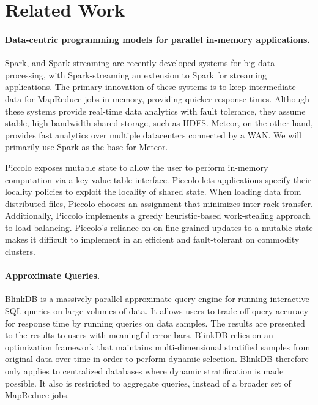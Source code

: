 \section{Related Work}

\paragraph{Data-centric programming models for parallel in-memory applications.}
Spark, and Spark-streaming \cite{spark} are recently developed systems for big-data processing, with Spark-streaming an extension to Spark for streaming applications. The primary innovation of these systems is to keep intermediate data for MapReduce jobs in memory, providing quicker response times. Although these systems provide real-time data analytics with fault tolerance, they assume stable, high bandwidth shared storage, such as HDFS. Meteor, on the other hand, provides fast analytics over multiple datacenters connected by a WAN. We will primarily use Spark as the base for Meteor.  

Piccolo \cite{piccolo} exposes mutable state to allow the user to perform in-memory computation via a key-value table interface. Piccolo lets applications specify their locality policies to exploit the locality of shared state. When loading data from distributed files, Piccolo chooses an assignment that minimizes inter-rack transfer. Additionally, Piccolo implements a greedy heuristic-based work-stealing approach to load-balancing. Piccolo's reliance on on fine-grained updates to a mutable state makes it difficult to implement in an efficient and fault-tolerant on commodity clusters.

\paragraph{Approximate Queries.}
BlinkDB \cite{blinkdb} is a massively parallel approximate query engine for running interactive SQL queries on large volumes of data. It allows users to trade-off query accuracy for response time by running queries on data samples. The results are presented to the results to users with meaningful error bars. BlinkDB relies on an optimization framework that maintains multi-dimensional stratified samples from original data over time in order to perform dynamic selection. BlinkDB therefore only applies to centralized databases where dynamic stratification is made possible. It also is restricted to aggregate queries, instead of a broader set of MapReduce jobs.

